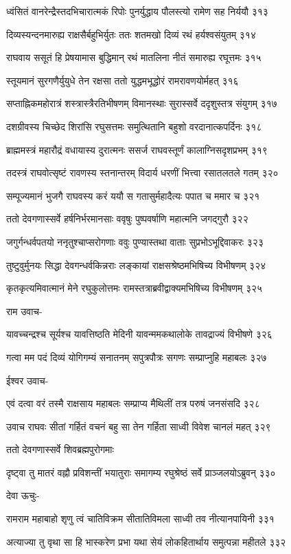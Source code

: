 ध्वंसितं वानरेन्द्रैस्तदभिचारात्मकं रिपोः
पुनर्युद्धाय पौलस्त्यो रामेण सह निर्ययौ ३१३

दिव्यस्यन्दनमारुह्य राक्षसैर्बहुभिर्युतः
ततः शतमखो दिव्यं रथं हर्यश्वसंयुतम् ३१४

राघवाय ससूतं हि प्रेषयामास बुद्धिमान्
रथं मातलिना नीतं समारुह्य रघूत्तमः ३१५

स्तूयमानं सुरगणैर्युयुधे तेन रक्षसा
ततो युद्धमभूद्धोरं रामरावणयोर्महत् ३१६

सप्ताह्निकमहोरात्रं शस्त्रास्त्रैरतिभीषणम्
विमानस्थाः सुरास्सर्वे ददृशुस्तत्र संयुगम् ३१७

दशग्रीवस्य चिच्छेद शिरांसि रघुसत्तमः
समुत्थितानि बहुशो वरदानात्कपर्दिनः ३१८

ब्राह्ममस्त्रं महारौद्रं वधायास्य दुरात्मनः
ससर्ज राघवस्तूर्णं कालाग्निसदृशप्रभम् ३१९

तदस्त्रं राघवोत्सृष्टं रावणस्य स्तनान्तरम्
विदार्य धरणीं भित्त्वा रसातलतले गतम् ३२०

सम्पूज्यमानं भुजगै राघवस्य करं ययौ
स गतासुर्महादैत्यः पपात च ममार च ३२१

ततो देवगणास्सर्वे हर्षनिर्भरमानसाः
ववृषुः पुष्पवर्षाणि महात्मनि जगद्गुरौ ३२२

जगुर्गन्धर्वपतयो ननृतुश्चाप्सरोगणाः
ववुः पुण्यास्तथा वाताः सुप्रभोऽभूद्दिवाकरः ३२३

तुष्टुवुर्मुनयः सिद्धा देवगन्धर्वकिन्नराः
लङ्कायां राक्षसश्रेष्ठमभिषिच्य विभीषणम् ३२४

कृतकृत्यमिवात्मानं मेने रघुकुलोत्तमः
रामस्तत्राब्रवीद्वाक्यमभिषिच्य विभीषणम् ३२५

राम उवाच-

यावच्चन्द्रश्च सूर्यश्च यावत्तिष्ठति मेदिनी
यावन्ममकथालोके तावद्राज्यं विभीषणे ३२६

गत्वा मम पदं दिव्यं योगिगम्यं सनातनम्
सपुत्रपौत्रः सगणः सम्प्राप्नुहि महाबलः ३२७

ईश्वर उवाच-

एवं दत्वा वरं तस्मै राक्षसाय महाबलः
सम्प्राप्य मैथिलीं तत्र परुषं जनसंसदि ३२८

उवाच राघवः सीतां गर्हितं वचनं बहु
सा तेन गर्हिता साध्वी विवेश चानलं महत् ३२९

ततो देवगणास्सर्वे शिवब्रह्मपुरोगमाः

दृष्ट्वा तु मातरं वह्नौ प्रविशन्तीं भयातुराः
समागम्य रघुश्रेष्ठं सर्वे प्राञ्जलयोऽब्रुवन् ३३०

देवा ऊचुः-

रामराम महाबाहो शृणु त्वं चातिविक्रम
सीतातिविमला साध्वी तव नीत्यानपायिनी ३३१

अत्याज्या तु वृथा सा हि भास्करेण प्रभा यथा
सेयं लोकहितार्थाय समुत्पन्ना महीतले ३३२

